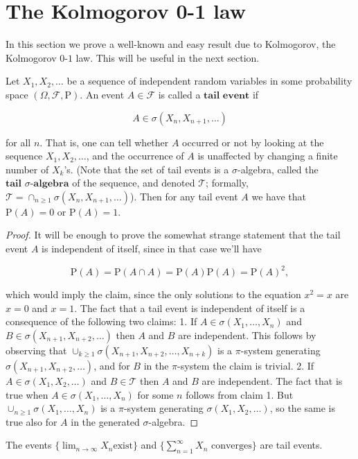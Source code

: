 \section{The Kolmogorov 0-1 law}

In this section we prove a well-known and easy result
due to Kolmogorov, the Kolmogorov $0$-$1$ law. This
will be useful in the next section.

\begin{thm}
Let $X_1,X_2,\ldots$ be a sequence of independent
random variables in some probability space
$(\Omega, \mathcal{F}, \mathrm{P})$. An event
$A\in \mathcal{F}$ is called a $\textbf{tail event}$
if

\[
A \in \sigma(X_n, X_{n+1}, \ldots)
\]

\noindent for all $n$. That is, one can tell whether $A$
occurred or not by looking at the sequence
$X_1,X_2,\ldots$, and the occurrence of $A$ is
unaffected by changing a finite number of $X_k$'s.
(Note that the set of tail events is a
$\sigma$-algebra, called the
$\textbf{tail } \sigma\textbf{-algebra}$ of the
sequence, and denoted $\mathcal{T}$; formally,
$\mathcal{T}=\cap_{n\ge 1}\sigma(X_n,X_{n+1},\ldots)$).
Then for any tail event $A$ we have that
$\mathrm{P}(A) = 0$ or $\mathrm{P}(A)=1$.
\end{thm}

\begin{proof}
It will be enough to prove the somewhat strange
statement that the tail event $A$ is independent of
itself, since in that case we'll have

\[
\mathrm{P}(A) = \mathrm{P}(A\cap A) = \mathrm{P}(A)\mathrm{P}(A) = \mathrm{P}(A)^2,
\]

\noindent which would imply the claim, since the only solutions
to the equation $x^2=x$ are $x=0$ and $x=1$. The fact
that a tail event is independent of itself is a
consequence of the following two claims: 1. If
$A \in \sigma(X_1,\ldots,X_n)$ and
$B\in \sigma(X_{n+1},X_{n+2},\ldots)$ then $A$ and $B$
are independent. This follows by observing that
$\cup_{k\ge1} \sigma(X_{n+1},X_{n+2},\ldots,X_{n+k})$
is a $\pi$-system generating
$\sigma(X_{n+1},X_{n+2},\ldots)$, and for $B$ in the
$\pi$-system the claim is trivial. 2. If
$A\in\sigma(X_1,X_2,\ldots)$ and $B\in\mathcal{T}$
then $A$ and $B$ are independent. The fact that is
true when $A\in \sigma(X_1,\ldots,X_n)$ for some $n$
follows from claim 1. But
$\cup_{n\ge 1} \sigma(X_1,\ldots,X_n)$ is a
$\pi$-system generating $\sigma(X_1,X_2,\ldots)$, so
the same is true also for $A$ in the generated
$\sigma$-algebra.
\end{proof}

\begin{example}
The events
$\{ \displaystyle \lim_{n\to\infty} X_n\textrm{
exist} \}$
and $\{ \sum_{n=1}^\infty X_n \textrm{ converges} \}$
are tail events.
\end{example}
